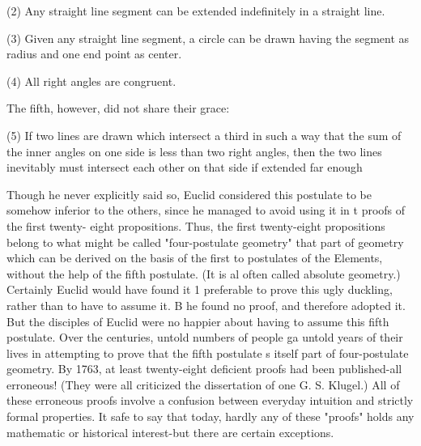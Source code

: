 (2) Any straight line segment can be extended indefinitely in a straight line. 

(3) Given any straight line segment, a circle can be drawn having the segment as radius and one end point as center. 

(4) All right angles are congruent. 

The fifth, however, did not share their grace: 

(5) If two lines are drawn which intersect a third in such a way that the sum of the inner angles on one side is less than two right angles, then the two lines inevitably must intersect each other on that side if extended far enough 







Though he never explicitly said so, Euclid considered this postulate to be somehow inferior to the others, since he managed to avoid using it in t proofs of the first twenty- eight propositions. Thus, the first twenty-eight propositions belong to what might be called "four-postulate geometry" that part of geometry which can be derived on the basis of the first to postulates of the Elements, without the help of the fifth postulate. (It is al often called absolute geometry.) Certainly Euclid would have found it 1 preferable to prove this ugly duckling, rather than to have to assume it. B he found no proof, and therefore adopted it. But the disciples of Euclid were no happier about having to assume this fifth postulate. Over the centuries, untold numbers of people ga untold years of their lives in attempting to prove that the fifth postulate s itself part of four-postulate geometry. By 1763, at least twenty-eight deficient proofs had been published-all erroneous! (They were all criticized the dissertation of one G. S. Klugel.) All of these erroneous proofs involve a confusion between everyday intuition and strictly formal properties. It safe to say that today, hardly any of these "proofs" holds any mathematic or historical interest-but there are certain exceptions. 

